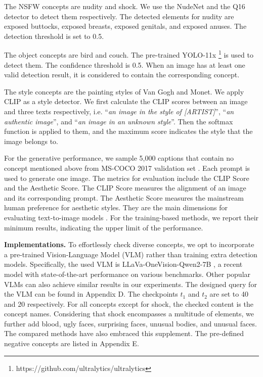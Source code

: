 The NSFW concepts are nudity and shock. We use the NudeNet \cite{nudenet} and the Q16 detector \cite{schramowski2022can} to detect them respectively. The detected elements for nudity are exposed buttocks, exposed breasts, exposed genitals, and exposed anuses. The detection threshold is set to 0.5.

The object concepts are bird and couch. The pre-trained YOLO-11x \footnote{https://github.com/ultralytics/ultralytics} is used to detect them. The confidence threshold is 0.5. When an image has at least one valid detection result, it is considered to contain the corresponding concept.

The style concepts are the painting styles of Van Gogh and Monet. We apply CLIP \cite{radford2021learning} as a style detector. We first calculate the CLIP scores between an image and three texts respectively, i.e. ``\textit{an image in the style of [ARTIST]}'', ``\textit{an authentic image}'', and ``\textit{an image in an unknown style}''. Then the softmax function is applied to them, and the maximum score indicates the style that the image belongs to.

For the generative performance, we sample 5,000 captions that contain no concept mentioned above from MS-COCO 2017 validation set \cite{lin2014microsoft}. Each prompt is used to generate one image. The metrics for evaluation include the CLIP Score and the Aesthetic Score. The CLIP Score \cite{radford2021learning} measures the alignment of an image and its corresponding prompt. The Aesthetic Score \cite{schuhmann2022laion} measures the mainstream human preference for aesthetic styles. They are the main dimensions for evaluating text-to-image models \cite{2023ImageReward}. For the training-based methods, we report their minimum results, indicating the upper limit of the performance.

\textbf{Implementations.} To effortlessly check diverse concepts, we opt to incorporate a pre-trained Vision-Language Model (VLM) \cite{du2022survey} rather than training extra detection models. Specifically, the used VLM is LLaVa-OneVision-Qwen2-7B \cite{li2024llava}, a recent model with state-of-the-art performance on various benchmarks. Other popular VLMs can also achieve similar results in our experiments. The designed query for the VLM can be found in Appendix D. The checkpoints $t_1$ and $t_2$ are set to 40 and 20 respectively. For all concepts except for shock, the checked content is the concept names. Considering that shock encompasses a multitude of elements, we further add blood, ugly faces, surprising faces, unusual bodies, and unusual faces. The compared methods have also embraced this supplement. The pre-defined negative concepts are listed in Appendix E.

